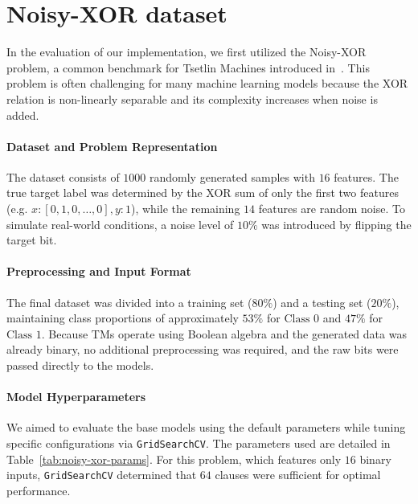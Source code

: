 \documentclass[english]{aghengthesis} %
\begin{document}
\clearpage
\section{Noisy-XOR dataset}
In the evaluation of our implementation, we first utilized the Noisy-XOR problem, a common benchmark for Tsetlin Machines introduced in~\cite{granmo2021tsetlinmachinegame}. This problem is often challenging for many machine learning models because the XOR relation is non-linearly separable and its complexity increases when noise is added.

\paragraph{Dataset and Problem Representation}
The dataset consists of $1000$ randomly generated samples with $16$ features. The true target label was determined by the XOR sum of only the first two features (e.g. $x: [0,1,0,\dots,0], y: 1$), while the remaining $14$ features are random noise. To simulate real-world conditions, a noise level of $10\%$ was introduced by flipping the target bit.

\paragraph{Preprocessing and Input Format}
The final dataset was divided into a training set ($80\%$) and a testing set ($20\%$), maintaining class proportions of approximately $53\%$ for $\text{Class } 0$ and $47\%$ for $\text{Class } 1$. Because TMs operate using Boolean algebra and the generated data was already binary, no additional preprocessing was required, and the raw bits were passed directly to the models.

\paragraph{Model Hyperparameters}
We aimed to evaluate the base models using the default parameters while tuning specific configurations via \texttt{GridSearchCV}. The parameters used are detailed in Table~\ref{tab:noisy-xor-params}. For this problem, which features only $16$ binary inputs, \texttt{GridSearchCV} determined that $64$ clauses were sufficient for optimal performance.
\end{document}
